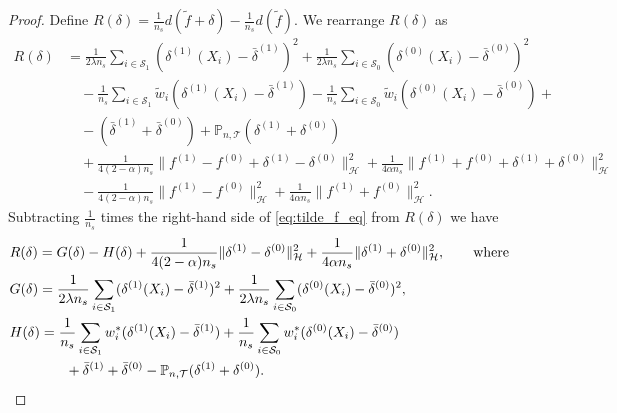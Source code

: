 \documentclass[12pt]{article}
\newcommand{\prob}{\mathbb{P}}
\begin{document}
\begin{proof}
	Define $R(\delta) = \frac{1}{n_s} d(\tilde{f} + \delta) - \frac{1}{n_s} d(\tilde{f})$. We rearrange $R(\delta)$ as
	\begin{align*}
		R(\delta)
		&=
		\frac{1}{2\lambda n_s} \sum_{i \in \mathcal{S}_1} (\delta^{(1)}(X_i) - \bar{\delta}^{(1)})^2 +
		\frac{1}{2\lambda n_s} \sum_{i \in \mathcal{S}_0} (\delta^{(0)}(X_i) - \bar{\delta}^{(0)})^2
		\\&\quad -
		\frac{1}{n_s} \sum_{i \in \mathcal{S}_1} \tilde{w}_i (\delta^{(1)}(X_i) - \bar{\delta}^{(1)}) -
		\frac{1}{n_s} \sum_{i \in \mathcal{S}_0} \tilde{w}_i (\delta^{(0)}(X_i) - \bar{\delta}^{(0)}) + 
		\\&\quad -
		(\bar{\delta}^{(1)} + \bar{\delta}^{(0)}) + \prob_{n, \mathcal{T}} (\delta^{(1)} + \delta^{(0)})
		\\&\quad +
		\frac{1}{4(2-\alpha) n_s} \| f^{(1)} - f^{(0)} + \delta^{(1)} - \delta^{(0)} \|_\mathcal{H}^2 + \frac{1}{4\alpha n_s} \| f^{(1)} + f^{(0)} + \delta^{(1)} + \delta^{(0)} \|_\mathcal{H}^2
		\\&\quad -
		\frac{1}{4(2-\alpha) n_s} \| f^{(1)} - f^{(0)} \|_\mathcal{H}^2 + \frac{1}{4\alpha n_s} \| f^{(1)} + f^{(0)} \|_\mathcal{H}^2
		.\end{align*}
	Subtracting $\frac{1}{n_s}$ times the right-hand side of \eqref{eq:tilde_f_eq} from $R(\delta)$ we have
	\begin{equation}
		\label{eq:R_G_H}
		\begin{aligned}
			&R(\delta) = G(\delta) - H(\delta) +
			\frac{1}{4(2-\alpha) n_s} 
			\| \delta^{(1)} - \delta^{(0)} \|_\mathcal{H}^2 +
			\frac{1}{4\alpha n_s} 
			\| \delta^{(1)} + \delta^{(0)} \|_\mathcal{H}^2
			,
			\qquad \textnormal{where}
			\\&
			G(\delta) = \frac{1}{2\lambda n_s} \sum_{i \in \mathcal{S}_1} (\delta^{(1)}(X_i) - \bar{\delta}^{(1)})^2 +
			\frac{1}{2\lambda n_s} \sum_{i \in \mathcal{S}_0} (\delta^{(0)}(X_i) - \bar{\delta}^{(0)})^2, 
			\\&
			H(\delta) = 
			\frac{1}{n_s} \sum_{i \in \mathcal{S}_1} w^*_i(\delta^{(1)}(X_i) - \bar{\delta}^{(1)}) +
			\frac{1}{n_s} \sum_{i \in \mathcal{S}_0} w^*_i(\delta^{(0)}(X_i) - \bar{\delta}^{(0)}) 
			\\&\qquad\qquad+ 
			\bar{\delta}^{(1)} + \bar{\delta}^{(0)} - 
			\prob_{n, \mathcal{T}} (\delta^{(1)} + \delta^{(0)}) 
			.\end{aligned}
	\end{equation}
	

\end{proof}
\end{document}
